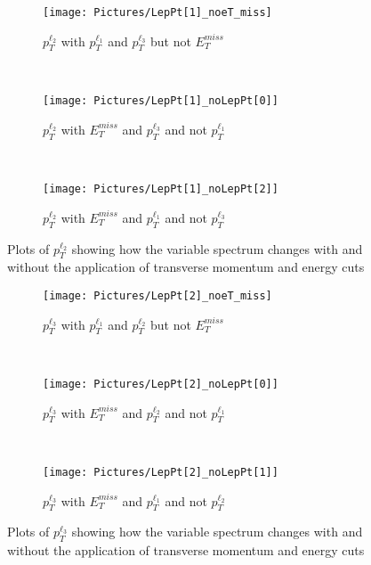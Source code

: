 \begin{figure}[H]
    \centering
    \begin{subfigure}[b]{0.48\textwidth}
        \centering
        \texttt{[image: Pictures/LepPt[1]\_noeT\_miss]}
    \caption{$p_{T}^{\ell_{2}}$ with $p_{T}^{\ell_{1}}$ and $p_{T}^{\ell_{3}}$ but not $E_{T}^{miss}$}
    \end{subfigure}
    ~
    \begin{subfigure}[b]{0.48\textwidth}
        \centering
        \texttt{[image: Pictures/LepPt[1]\_noLepPt[0]]}
    \caption{$p_{T}^{\ell_{2}}$ with $E_{T}^{miss}$ and $p_{T}^{\ell_{3}}$ and not $p_{T}^{\ell_{1}}$}    
        \end{subfigure}
    ~
    \begin{subfigure}[b]{0.48\textwidth}
        \centering
        \texttt{[image: Pictures/LepPt[1]\_noLepPt[2]]}
    \caption{$p_{T}^{\ell_{2}}$ with $E_{T}^{miss}$ and $p_{T}^{\ell_{1}}$ and not $p_{T}^{\ell_{3}}$}    
        \end{subfigure}
\caption{Plots of $p_{T}^{\ell_{2}}$ showing how the variable spectrum changes with and without the application of transverse momentum and energy cuts}
\label{fig:LepPt[1]N-1ON}
\end{figure}

\begin{figure}[H]
    \centering
    \begin{subfigure}[b]{0.48\textwidth}
        \centering
        \texttt{[image: Pictures/LepPt[2]\_noeT\_miss]}
    \caption{$p_{T}^{\ell_{3}}$ with $p_{T}^{\ell_{1}}$ and $p_{T}^{\ell_{2}}$ but not $E_{T}^{miss}$}
    \end{subfigure}
    ~
    \begin{subfigure}[b]{0.48\textwidth}
        \centering
        \texttt{[image: Pictures/LepPt[2]\_noLepPt[0]]}
    \caption{$p_{T}^{\ell_{3}}$ with $E_{T}^{miss}$ and $p_{T}^{\ell_{2}}$ and not $p_{T}^{\ell_{1}}$}    
        \end{subfigure}
    ~
    \begin{subfigure}[b]{0.48\textwidth}
        \centering
        \texttt{[image: Pictures/LepPt[2]\_noLepPt[1]]}
    \caption{$p_{T}^{\ell_{3}}$ with $E_{T}^{miss}$ and $p_{T}^{\ell_{1}}$ and not $p_{T}^{\ell_{2}}$}    
        \end{subfigure}
\caption{Plots of $p_{T}^{\ell_{3}}$ showing how the variable spectrum changes with and without the application of transverse momentum and energy cuts}
\label{fig:LepPt[2]N-1ON}
\end{figure}











